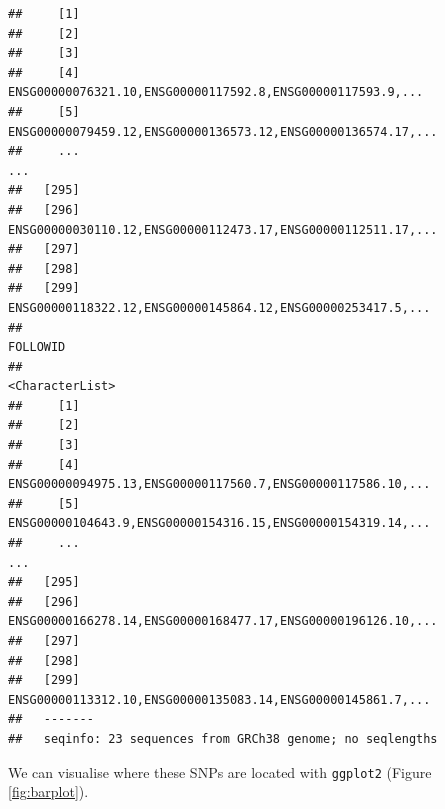 \documentclass[9pt,a4paper,]{extarticle}
\newenvironment{Shaded}{\begin{snugshade}}{\end{snugshade}}
\newcommand{\KeywordTok}[1]{\textcolor[rgb]{0.13,0.29,0.53}{\textbf{#1}}}
\newcommand{\DataTypeTok}[1]{\textcolor[rgb]{0.13,0.29,0.53}{#1}}
\newcommand{\StringTok}[1]{\textcolor[rgb]{0.31,0.60,0.02}{#1}}
\newcommand{\OperatorTok}[1]{\textcolor[rgb]{0.81,0.36,0.00}{\textbf{#1}}}
\newcommand{\NormalTok}[1]{#1}
\begin{document}
\begin{verbatim}
##     [1]                                                             
##     [2]                                                             
##     [3]                                                             
##     [4]   ENSG00000076321.10,ENSG00000117592.8,ENSG00000117593.9,...
##     [5] ENSG00000079459.12,ENSG00000136573.12,ENSG00000136574.17,...
##     ...                                                          ...
##   [295]                                                             
##   [296] ENSG00000030110.12,ENSG00000112473.17,ENSG00000112511.17,...
##   [297]                                                             
##   [298]                                                             
##   [299]  ENSG00000118322.12,ENSG00000145864.12,ENSG00000253417.5,...
##                                                             FOLLOWID
##                                                      <CharacterList>
##     [1]                                                             
##     [2]                                                             
##     [3]                                                             
##     [4]  ENSG00000094975.13,ENSG00000117560.7,ENSG00000117586.10,...
##     [5]  ENSG00000104643.9,ENSG00000154316.15,ENSG00000154319.14,...
##     ...                                                          ...
##   [295]                                                             
##   [296] ENSG00000166278.14,ENSG00000168477.17,ENSG00000196126.10,...
##   [297]                                                             
##   [298]                                                             
##   [299]  ENSG00000113312.10,ENSG00000135083.14,ENSG00000145861.7,...
##   -------
##   seqinfo: 23 sequences from GRCh38 genome; no seqlengths
\end{verbatim}

We can visualise where these SNPs are located with \texttt{ggplot2} \citep{Wickham2009} (Figure \ref{fig:barplot}).

\begin{Shaded}
\end{Shaded}
\end{document}
